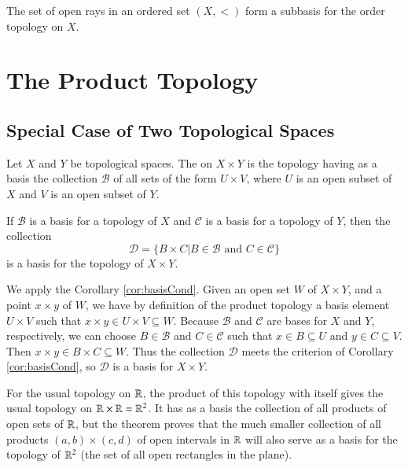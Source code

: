 \documentclass[12pt, a4paper, twoside, openright, titlepage]{book}
\begin{document}
\begin{rmk}{}{}
    The set of open rays in an ordered set $(X,<)$ form a subbasis for the order topology on $X$.
\end{rmk}


\section{The Product Topology}

\subsection{Special Case of Two Topological Spaces}

\begin{defn}{}{}
    Let $X$ and $Y$ be topological spaces. The  on $X\times Y$ is the topology having as a basis the collection $\mathcal{B}$ of all sets of the form $U\times V$, where $U$ is an open subset of $X$ and $V$ is an open subset of $Y$.
\end{defn}


\begin{thm}{}{}
    If $\mathcal{B}$ is a basis for a topology of $X$ and $\mathcal{C}$ is a basis for a topology of $Y$, then the collection\begin{equation*}
        \mathcal{D} = \{B\times C\vert B \in \mathcal{B}\text{ and } C \in \mathcal{C}\}
    \end{equation*}
    is a basis for the topology of $X\times Y$.
\end{thm}
\begin{proof*}{}{}
    We apply the Corollary \ref{cor:basisCond}. Given an open set $W$ of $X\times Y$, and a point $x\times y$ of $W$, we have by definition of the product topology a basis element $U\times V$ such that $x\times y \in U\times V \subseteq W$. Because $\mathcal{B}$ and $\mathcal{C}$ are bases for $X$ and $Y$, respectively, we can choose $B \in \mathcal{B}$ and $C \in \mathcal{C}$ such that $x \in B \subseteq U$ and $y \in C \subseteq V$. Then $x \times y \in B\times C\subseteq W$. Thus the collection $\mathcal{D}$ meets the criterion of Corollary \ref{cor:basisCond}, so $\mathcal{D}$ is a basis for $X\times Y$.
\end{proof*}


\begin{eg}{}{}
    For the usual topology on $\mathbb R$, the product of this topology with itself gives the usual topology on $\mathbb R\times \mathbb R = \mathbb R^2$. It has as a basis the collection of all products of open sets of $\mathbb R$, but the theorem proves that the much smaller collection of all products $(a,b)\times(c,d)$ of open intervals in $\mathbb R$ will also serve as a basis for the topology of $\mathbb R^2$ (the set of all open rectangles in the plane).
\end{eg}
\end{document}
